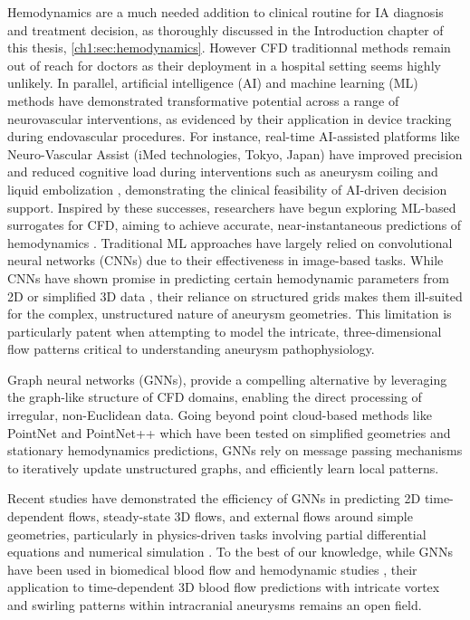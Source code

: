 Hemodynamics are a much needed addition to clinical routine for IA diagnosis and treatment decision, as thoroughly discussed in the Introduction chapter of this thesis, \autoref{ch1:sec:hemodynamics}. However CFD traditionnal methods remain out of reach for doctors as their deployment in a hospital setting seems highly unlikely. In parallel, artificial intelligence (AI) and machine learning (ML) methods have demonstrated transformative potential across a range of neurovascular interventions, as evidenced by their application in device tracking during endovascular procedures. For instance, real-time AI-assisted platforms like Neuro-Vascular Assist (iMed technologies, Tokyo, Japan) have improved precision and reduced cognitive load during interventions such as aneurysm coiling and liquid embolization \cite{sakakura_real_2024, sakakura_pioneering_2024}, demonstrating the clinical feasibility of AI-driven decision support. Inspired by these successes, researchers have begun exploring ML-based surrogates for CFD, aiming to achieve accurate, near-instantaneous predictions of hemodynamics \cite{arzani_machine_2022}. Traditional ML approaches have largely relied on convolutional neural networks (CNNs) due to their effectiveness in image-based tasks. While CNNs have shown promise in predicting certain hemodynamic parameters from 2D or simplified 3D data \cite{gharleghi_transient_2022, ferdian_wssnet_2022, rutkowski_enhancement_2021}, their reliance on structured grids makes them ill-suited for the complex, unstructured nature of aneurysm geometries. This limitation is particularly patent when attempting to model the intricate, three-dimensional flow patterns critical to understanding aneurysm pathophysiology. 

Graph neural networks (GNNs), provide a compelling alternative by leveraging the graph-like structure of CFD domains, enabling the direct processing of irregular, non-Euclidean data. Going beyond point cloud-based methods like PointNet and PointNet++\cite{charles_pointnet_2017, qi_pointnet_2017} which have been tested on simplified geometries and stationary hemodynamics predictions\cite{li_prediction_2021, suk_physics-informed_2024}, GNNs rely on message passing mechanisms to iteratively update unstructured graphs, and efficiently learn local patterns.  

Recent studies have demonstrated the efficiency of GNNs in predicting 2D time-dependent flows, steady-state 3D flows, and external flows around simple geometries, particularly in physics-driven tasks involving partial differential equations and numerical simulation \cite{pfaff_learning_2021, hernandez_thermodynamics-informed_2024, lam_learning_2023, li_physics-constrained_2024, gladstone_gnn-based_2023, pelissier_graph_2024}. To the best of our knowledge, while GNNs have been used in biomedical blood flow and hemodynamic studies \cite{sen_physics-informed_2024, suk_mesh_2024, pegolotti_learning_2024, feiger_accelerating_2020, li_prediction_2021-1, liang_feasibility_2020}, their application to time-dependent 3D blood flow predictions with intricate vortex and swirling patterns within intracranial aneurysms remains an open field.

